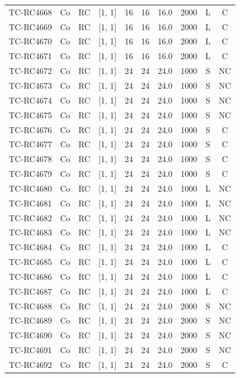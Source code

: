 \begin{longtable}{lccccccccc}
TC-RC4668 & Co & RC & [1, 1] & 16 & 16 & 16.0 & 2000 & L & C \\
TC-RC4669 & Co & RC & [1, 1] & 16 & 16 & 16.0 & 2000 & L & C \\
TC-RC4670 & Co & RC & [1, 1] & 16 & 16 & 16.0 & 2000 & L & C \\
TC-RC4671 & Co & RC & [1, 1] & 16 & 16 & 16.0 & 2000 & L & C \\
TC-RC4672 & Co & RC & [1, 1] & 24 & 24 & 24.0 & 1000 & S & NC \\
TC-RC4673 & Co & RC & [1, 1] & 24 & 24 & 24.0 & 1000 & S & NC \\
TC-RC4674 & Co & RC & [1, 1] & 24 & 24 & 24.0 & 1000 & S & NC \\
TC-RC4675 & Co & RC & [1, 1] & 24 & 24 & 24.0 & 1000 & S & NC \\
TC-RC4676 & Co & RC & [1, 1] & 24 & 24 & 24.0 & 1000 & S & C \\
TC-RC4677 & Co & RC & [1, 1] & 24 & 24 & 24.0 & 1000 & S & C \\
TC-RC4678 & Co & RC & [1, 1] & 24 & 24 & 24.0 & 1000 & S & C \\
TC-RC4679 & Co & RC & [1, 1] & 24 & 24 & 24.0 & 1000 & S & C \\
TC-RC4680 & Co & RC & [1, 1] & 24 & 24 & 24.0 & 1000 & L & NC \\
TC-RC4681 & Co & RC & [1, 1] & 24 & 24 & 24.0 & 1000 & L & NC \\
TC-RC4682 & Co & RC & [1, 1] & 24 & 24 & 24.0 & 1000 & L & NC \\
TC-RC4683 & Co & RC & [1, 1] & 24 & 24 & 24.0 & 1000 & L & NC \\
TC-RC4684 & Co & RC & [1, 1] & 24 & 24 & 24.0 & 1000 & L & C \\
TC-RC4685 & Co & RC & [1, 1] & 24 & 24 & 24.0 & 1000 & L & C \\
TC-RC4686 & Co & RC & [1, 1] & 24 & 24 & 24.0 & 1000 & L & C \\
TC-RC4687 & Co & RC & [1, 1] & 24 & 24 & 24.0 & 1000 & L & C \\
TC-RC4688 & Co & RC & [1, 1] & 24 & 24 & 24.0 & 2000 & S & NC \\
TC-RC4689 & Co & RC & [1, 1] & 24 & 24 & 24.0 & 2000 & S & NC \\
TC-RC4690 & Co & RC & [1, 1] & 24 & 24 & 24.0 & 2000 & S & NC \\
TC-RC4691 & Co & RC & [1, 1] & 24 & 24 & 24.0 & 2000 & S & NC \\
TC-RC4692 & Co & RC & [1, 1] & 24 & 24 & 24.0 & 2000 & S & C \\

\end{longtable}
